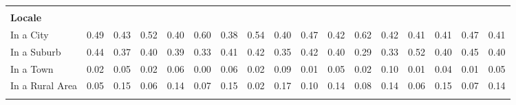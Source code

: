 \begin{tabular*}{\linewidth}{@{\extracolsep{\fill} } lcccccccccccccccc}
&&&&&&&&&&&&&&&&\\%
\multicolumn{17}{l}{\bfseries Locale}\\%
\hspace{0.2cm}In a City&0.49&0.43&0.52&0.40&0.60&0.38&0.54&0.40&0.47&0.42&0.62&0.42&0.41&0.41&0.47&0.41\\%
\hspace{0.2cm}In a Suburb&0.44&0.37&0.40&0.39&0.33&0.41&0.42&0.35&0.42&0.40&0.29&0.33&0.52&0.40&0.45&0.40\\%
\hspace{0.2cm}In a Town&0.02&0.05&0.02&0.06&0.00&0.06&0.02&0.09&0.01&0.05&0.02&0.10&0.01&0.04&0.01&0.05\\%
\hspace{0.2cm}In a Rural Area&0.05&0.15&0.06&0.14&0.07&0.15&0.02&0.17&0.10&0.14&0.08&0.14&0.06&0.15&0.07&0.14\\%
&&&&&&&&&&&&&&&&\\%
\hline%
\end{tabular*}